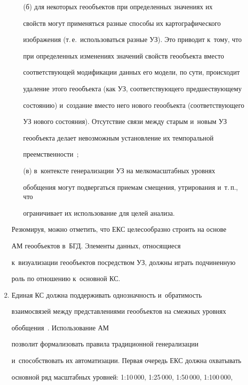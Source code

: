 \begin{enumerate}[1.]
\begin{itemize}
  \item[(б)] для некоторых геообъектов при определенных значениях их 


свойств могут применяться разные способы их картографического 


изображения (т.\,е.\ использоваться разные УЗ). Это приводит к~тому, что 


при определенных изменениях значений свойств геообъекта вместо 


соответствующей модификации данных его модели, по сути, происходит 


удаление этого геообъекта (как УЗ, соответствующего предшествующему 


состоянию) и~создание вместо него нового геообъекта (соответствующего 


УЗ нового состояния). Отсутствие связи между старым и~новым УЗ 


геообъекта делает невозможным установление их темпоральной 


преемственности~\cite{4-nik};


  \item[(в)] в~контексте генерализации УЗ на мелкомасштабных уровнях 


обобщения могут подвергаться приемам смещения, утрирования и~т.\,п., что 


ограничивает их использование для целей анализа.


  \end{itemize}


  


  Резюмируя, можно отметить, что ЕКС целесообразно строить на основе 


АМ геообъектов в~БГД. Элементы данных, относящиеся 


к~визуализации геообъектов посредством УЗ, должны играть подчиненную 


роль по отношению к~основной КС.


  \item Единая КС должна поддерживать однозначность и~обратимость 


взаимосвязей между представлениями геообъектов на смежных уровнях 


обобщения~\cite{4-nik, 11-nik}. Использование АМ 


позволит формализовать правила традиционной генерализации 


и~способствовать их автоматизации. Первая очередь ЕКС должна охватывать 


основной ряд масштабных уровней: 1:10\,000, 1:25\,000, 1:50\,000, 1:100\,000, 



\end{enumerate}
